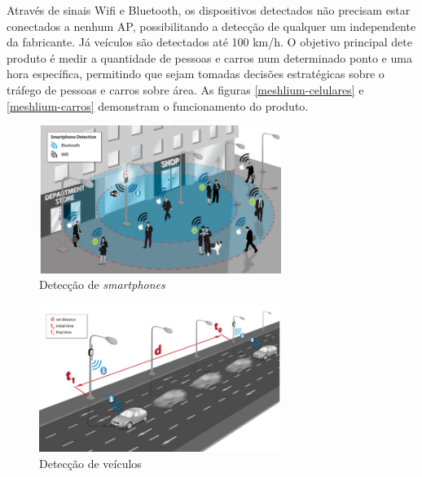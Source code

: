 Através de sinais Wifi e Bluetooth, os dispositivos detectados não precisam estar conectados a nenhum AP, possibilitando a detecção de qualquer um
independente da fabricante. Já veículos são detectados até 100 km/h. O objetivo principal dete produto é medir a quantidade de pessoas e carros
num determinado ponto e uma hora específica, permitindo que sejam tomadas decisões estratégicas sobre o tráfego de pessoas e carros sobre área.
As figuras \autoref{meshlium-celulares} e \autoref{meshlium-carros} demonstram o funcionamento do produto.

\begin{figure}[htb]
	\caption{\label{meshlium-celulares}Detecção de \emph{smartphones}}
	\begin{center}
		\includegraphics[width=0.70\textwidth]{img/meshlium-celulares.png}
	\end{center}
\end{figure}

\begin{figure}[htb]
	\caption{\label{meshlium-carros}Detecção de veículos}
	\begin{center}
		\includegraphics[width=0.70\textwidth]{img/meshlium-carros.png}
	\end{center}
\end{figure}
